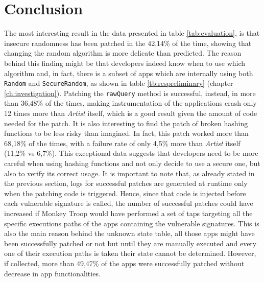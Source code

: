 \section{Conclusion}
The most interesting result in the data presented in table \ref{tab:evaluation}, is that insecure randomness has been patched in the 42,14\% of the time, showing that changing the random algorithm is more delicate than predicted. The reason behind this finding might be that developers indeed know when to use which algorithm and, in fact, there is a subset of apps which are internally using both \texttt{Random} and \texttt{SecureRandom}, as shown in table \ref{tb:respreliminary} (chapter \ref{ch:investigation}). Patching the \texttt{rawQuery} method is successful, instead, in more than 36,48\% of the times, making instrumentation of the applications crash only 12 times more than \emph{Artist} itself, which is a good result given the amount of code needed for the patch. It is also interesting to find the patch of broken hashing functions to be less risky than imagined. In fact, this patch worked more than 68,18\% of the times, with a failure rate of only 4,5\% more than \emph{Artist} itself (11,2\% vs 6,7\%). This exceptional data suggests that developers need to be more careful when using hashing functions and not only decide to use a secure one, but also to verify its correct usage. It is important to note that, as already stated in the previous section, logs for successful patches are generated at runtime only when the patching code is triggered. Hence, since that code is injected before each vulnerable signature is called, the number of successful patches could have increased if Monkey Troop would have performed a set of taps targeting all the specific executions paths of the apps containing the vulnerable signatures. This is also the main reason behind the unknown state table, all those apps might have been successfully patched or not but until they are manually executed and every one of their execution paths is taken their state cannot be determined.
However, if collected, more than 49,47\% of the apps were successfully patched without decrease in app functionalities.

